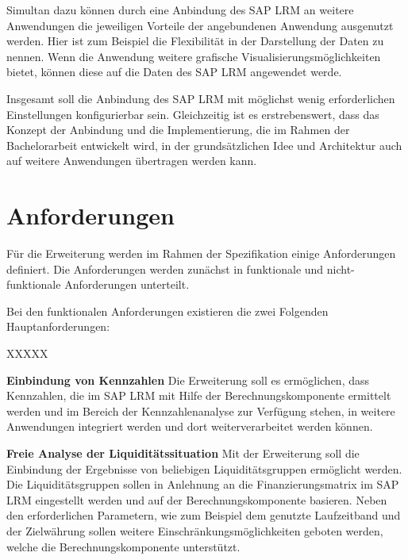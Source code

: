 \begin{onehalfspacing}
Simultan dazu können durch eine Anbindung des SAP LRM an weitere Anwendungen die jeweiligen Vorteile der angebundenen Anwendung ausgenutzt werden. Hier ist zum Beispiel die Flexibilität in der Darstellung der Daten zu nennen. Wenn die Anwendung weitere grafische Visualisierungsmöglichkeiten bietet, können diese auf die Daten des SAP LRM angewendet werde.

Insgesamt soll die Anbindung des SAP LRM mit möglichst wenig erforderlichen Einstellungen konfigurierbar sein. Gleichzeitig ist es erstrebenswert, dass das Konzept der Anbindung und die Implementierung, die im Rahmen der Bachelorarbeit entwickelt wird, in der grundsätzlichen Idee und Architektur auch auf weitere Anwendungen übertragen werden kann.

\section{Anforderungen}
\label{sec:anforderungen}
Für die Erweiterung werden im Rahmen der Spezifikation einige Anforderungen definiert. Die Anforderungen werden zunächst in funktionale und nicht-funktionale Anforderungen unterteilt. 

Bei den funktionalen Anforderungen existieren die zwei Folgenden Hauptanforderungen:

\begin{seToplist}{ XXXXX }

\item[\anfl{kpi}] \textbf{Einbindung von Kennzahlen} \newline
Die Erweiterung soll es ermöglichen, dass Kennzahlen, die im SAP LRM  mit Hilfe der Berechnungskomponente ermittelt werden und im Bereich der Kennzahlenanalyse zur Verfügung stehen, in weitere Anwendungen integriert werden und dort weiterverarbeitet werden können.

\item[\anfl{fundingMatrix}] \textbf{Freie Analyse der Liquiditätssituation} \newline
Mit der Erweiterung soll die Einbindung der Ergebnisse von beliebigen Liquiditätsgruppen ermöglicht werden. Die Liquiditätsgruppen sollen in Anlehnung an die Finanzierungsmatrix im SAP LRM eingestellt werden und auf der Berechnungskomponente basieren. Neben den erforderlichen Parametern, wie zum Beispiel dem genutzte Laufzeitband und der Zielwährung sollen weitere Einschränkungsmöglichkeiten geboten werden, welche die Berechnungskomponente unterstützt.

\end{seToplist}


\end{onehalfspacing}
